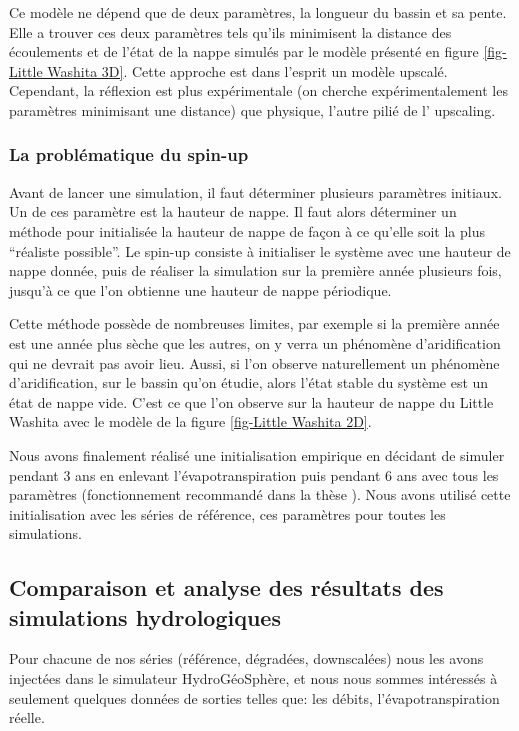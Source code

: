 \documentclass[a4paper,11pt]{article}
\numberwithin{equation}{section}
\begin{document}
Ce modèle ne dépend que de deux paramètres, la longueur du bassin et sa pente. Elle a trouver ces deux paramètres tels qu'ils minimisent la distance des écoulements et de l'état de la nappe simulés par le modèle présenté en figure \ref{fig-Little Washita 3D}. Cette approche est dans l'esprit un modèle upscalé. Cependant, la réflexion est plus expérimentale (on cherche expérimentalement les paramètres minimisant une distance) que physique, l'autre pilié de l' upscaling.

\subsubsection{La problématique du spin-up}

Avant de lancer une simulation, il faut déterminer plusieurs paramètres initiaux. Un de ces paramètre est la hauteur de nappe. Il faut alors déterminer un méthode pour initialisée la hauteur de nappe de façon à ce qu'elle soit la plus ``réaliste possible''. Le spin-up consiste à initialiser le système avec une hauteur de nappe donnée, puis de réaliser la simulation sur la première année plusieurs fois, jusqu'à ce que l'on obtienne une hauteur de nappe périodique. 

Cette méthode possède de nombreuses limites, par exemple si la première année est une année plus sèche que les autres, on y verra un phénomène d'aridification qui ne devrait pas avoir lieu. Aussi, si l'on observe naturellement un phénomène d'aridification, sur le bassin qu'on étudie, alors l'état stable du système est un état de nappe vide. C'est ce que l'on observe sur la hauteur de nappe du Little Washita avec le modèle de la figure \ref{fig-Little Washita 2D}.

Nous avons finalement réalisé une initialisation empirique en décidant de simuler pendant 3 ans en enlevant l'évapotranspiration puis pendant 6 ans avec tous les paramètres (fonctionnement recommandé dans la thèse \cite{maquin2016developpement}). Nous avons utilisé cette initialisation avec les séries de référence, ces paramètres pour toutes les simulations. 

\subsection{Comparaison et analyse des résultats des simulations hydrologiques}

Pour chacune de nos séries (référence, dégradées, downscalées) nous les avons injectées dans le simulateur HydroGéoSphère, et nous nous sommes intéressés à seulement quelques données de sorties telles que: les débits, l'évapotranspiration réelle.
\end{document}
